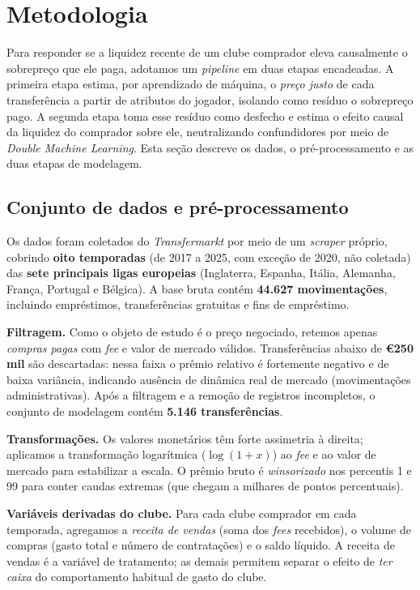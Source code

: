 \documentclass[12pt]{article}
\begin{document}
\section{Metodologia}

Para responder se a liquidez recente de um clube comprador eleva causalmente o sobrepreço que ele
paga, adotamos um \textit{pipeline} em duas etapas encadeadas. A primeira etapa estima, por
aprendizado de máquina, o \textit{preço justo} de cada transferência a partir de atributos do
jogador, isolando como resíduo o sobrepreço pago. A segunda etapa toma esse resíduo como desfecho e
estima o efeito causal da liquidez do comprador sobre ele, neutralizando confundidores por meio de
\textit{Double Machine Learning}. Esta seção descreve os dados, o pré-processamento e as duas
etapas de modelagem.

\subsection{Conjunto de dados e pré-processamento}

Os dados foram coletados do \textit{Transfermarkt} por meio de um \textit{scraper} próprio, cobrindo
\textbf{oito temporadas} (de 2017 a 2025, com exceção de 2020, não coletada) das \textbf{sete
principais ligas europeias} (Inglaterra, Espanha, Itália, Alemanha, França, Portugal e Bélgica).
A base bruta contém \textbf{44.627 movimentações}, incluindo empréstimos, transferências gratuitas e
fins de empréstimo.

\textbf{Filtragem.} Como o objeto de estudo é o preço negociado, retemos apenas \textit{compras
pagas} com \textit{fee} e valor de mercado válidos. Transferências abaixo de \textbf{€250 mil} são
descartadas: nessa faixa o prêmio relativo é fortemente negativo e de baixa variância, indicando
ausência de dinâmica real de mercado (movimentações administrativas). Após a filtragem e a remoção
de registros incompletos, o conjunto de modelagem contém \textbf{5.146 transferências}.

\textbf{Transformações.} Os valores monetários têm forte assimetria à direita; aplicamos a
transformação logarítmica ($\log(1+x)$) ao \textit{fee} e ao valor de mercado para estabilizar a
escala. O prêmio bruto é \textit{winsorizado} nos percentis 1 e 99 para conter caudas extremas
(que chegam a milhares de pontos percentuais).

\textbf{Variáveis derivadas do clube.} Para cada clube comprador em cada temporada, agregamos a
\textit{receita de vendas} (soma dos \textit{fees} recebidos), o volume de compras (gasto total e
número de contratações) e o saldo líquido. A receita de vendas é a variável de tratamento; as
demais permitem separar o efeito de \textit{ter caixa} do comportamento habitual de gasto do clube.
\end{document}
